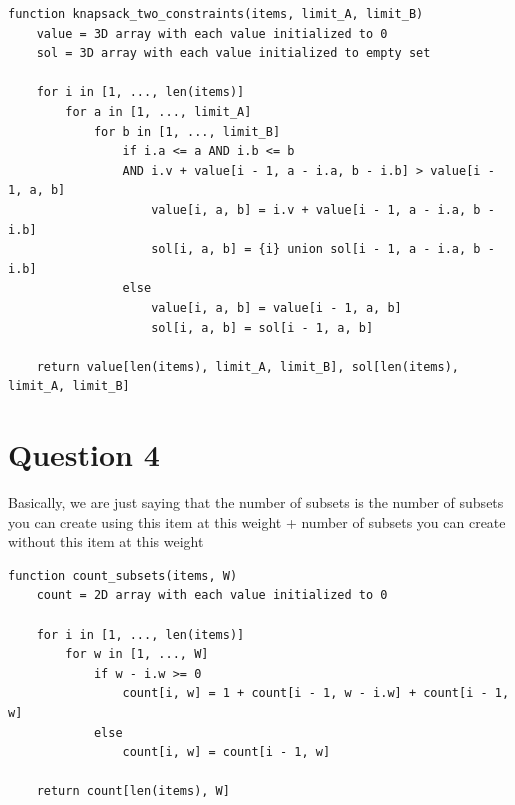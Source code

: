 \documentclass[11pt, oneside]{article}
\begin{document}
\begin{lstlisting}
function knapsack_two_constraints(items, limit_A, limit_B)
    value = 3D array with each value initialized to 0
    sol = 3D array with each value initialized to empty set

    for i in [1, ..., len(items)]
        for a in [1, ..., limit_A]
            for b in [1, ..., limit_B]
                if i.a <= a AND i.b <= b 
                AND i.v + value[i - 1, a - i.a, b - i.b] > value[i - 1, a, b]
                    value[i, a, b] = i.v + value[i - 1, a - i.a, b - i.b]
                    sol[i, a, b] = {i} union sol[i - 1, a - i.a, b - i.b]
                else
                    value[i, a, b] = value[i - 1, a, b]
                    sol[i, a, b] = sol[i - 1, a, b]
                    
    return value[len(items), limit_A, limit_B], sol[len(items), limit_A, limit_B]
\end{lstlisting}

\clearpage

\section{Question 4}

Basically, we are just saying that the number of subsets is the number of subsets you can create using this item at this weight + number of subsets you can create without this item at this weight

\begin{lstlisting}
function count_subsets(items, W)
    count = 2D array with each value initialized to 0

    for i in [1, ..., len(items)]
        for w in [1, ..., W]
            if w - i.w >= 0
                count[i, w] = 1 + count[i - 1, w - i.w] + count[i - 1, w]
            else
                count[i, w] = count[i - 1, w]

    return count[len(items), W]
\end{lstlisting}

\clearpage
\end{document}
